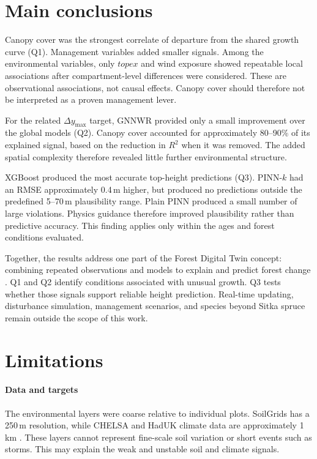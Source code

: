 \documentclass[logo,msc,ai]{infthesis}           %
\begin{document}
\section{Main conclusions}

Canopy cover was the strongest correlate of departure from the shared growth curve (Q1). Management variables added smaller signals. Among the environmental variables, only $\mathit{topex}$ and wind exposure showed repeatable local associations after compartment-level differences were considered. These are observational associations, not causal effects. Canopy cover should therefore not be interpreted as a proven management lever.

For the related $\Delta y_{\max}$ target, GNNWR provided only a small improvement over the global models (Q2). Canopy cover accounted for approximately 80--90\% of its explained signal, based on the reduction in $R^2$ when it was removed. The added spatial complexity therefore revealed little further environmental structure.

XGBoost produced the most accurate top-height predictions (Q3). PINN-$k$ had an RMSE approximately 0.4\,m higher, but produced no predictions outside the predefined 5--70\,m plausibility range. Plain PINN produced a small number of large violations. Physics guidance therefore improved plausibility rather than predictive accuracy. This finding applies only within the ages and forest conditions evaluated.

Together, the results address one part of the Forest Digital Twin concept: combining repeated observations and models to explain and predict forest change \cite{baskent2026Review_C1_SS,buonocore2022Proposal_C1_SS}. Q1 and Q2 identify conditions associated with unusual growth. Q3 tests whether those signals support reliable height prediction. Real-time updating, disturbance simulation, management scenarios, and species beyond Sitka spruce remain outside the scope of this work.

\section{Limitations}

\paragraph*{Data and targets}

The environmental layers were coarse relative to individual plots. SoilGrids has a 250\,m resolution, while CHELSA and HadUK climate data are approximately 1\,km \cite{poggio2021SoilGrids_C3_LID,karger2021CHELSA_C3_LID,hollis2019HadUKGrid_C3_LID}. These layers cannot represent fine-scale soil variation or short events such as storms. This may explain the weak and unstable soil and climate signals.
\end{document}
